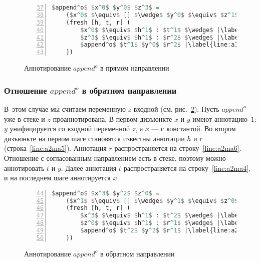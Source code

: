 \documentclass[conference,a4paper,american,russian]{IEEEtran}
\begin{document}
\begin{figure}[h!]
  \begin{center}
  \begin{minipage}{0.31\textwidth}
  \begin{lstlisting}[language=Haskell, frame=single, numbers=left,numberstyle=\small, firstnumber=37, escapechar=|]
  $append^o$ $x^0$ $y^0$ $z^3$ =
    ($x^0$ $\equiv$ [] $\wedge$ $y^0$ $\equiv$ $z^1$) $\vee$ |\label{line:a1ma2}|
    (fresh [h, t, r] (
        $x^0$ $\equiv$ $h^1$ : $t^1$ $\wedge$ |\label{line:a1ma4}|
        $z^3$ $\equiv$ $h^1$ : $r^2$ $\wedge$ |\label{line:a1ma5}|
        $append^o$ $t^1$ $y^0$ $r^2$ |\label{line:a1ma6}|
    ))
    \end{lstlisting}
  \end{minipage}
  \end{center}
  \caption{Аннотирование $append^o$ в прямом направлении}
  \label{lst:appendoANN1}
\end{figure}

\subsubsection{Отношение $append^o$ в обратном направлении}

В~этом случае мы считаем переменную $z$ входной (см. рис.~\ref{lst:appendoANN2}).
Пусть $append^o$ уже в стеке и $z$ проаннотирована.
В первом дизъюнкте $x$ и $y$ имеют аннотацию~$1$: $y$ унифицируется со входной переменной $z$, а $x$ --- с константой.
Во втором дизъюнкте на первом шаге становятся известны аннотации $h$ и $r$ (строка~\ref{line:a2ma5}).
Аннотация $r$ распространяется на строку~\ref{line:a2ma6}.
Отношение с согласованным направлением есть в стеке, поэтому можно аннотировать $t$ и $y$.
Далее аннотация $t$ распространяется на строку~\ref{line:a2ma4}, и на последнем шаге аннотируется $x$.

\begin{figure}[h!]
  \begin{center}
  \begin{minipage}{0.3\textwidth}
  \begin{lstlisting}[language=Haskell, frame=single, numbers=left,numberstyle=\small, firstnumber=44, escapechar=|]
  $append^o$ $x^3$ $y^2$ $z^0$ =
    ($x^1$ $\equiv$ [] $\wedge$ $y^1$ $\equiv$ $z^0$) $\vee$ |\label{line:a2ma2}|
    (fresh [h, t, r] (
        $x^3$ $\equiv$ $h^1$ : $t^2$ $\wedge$ |\label{line:a2ma4}|
        $z^0$ $\equiv$ $h^1$ : $r^1$ $\wedge$ |\label{line:a2ma5}|
        $append^o$ $t^2$ $y^2$ $r^1$ |\label{line:a2ma6}|
    ))
    \end{lstlisting}
  \end{minipage}
  \end{center}
  \caption{Аннотирование $append^o$ в обратном направлении}
  \label{lst:appendoANN2}
\end{figure}
\end{document}
